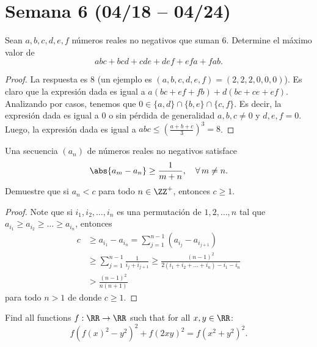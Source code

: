 \section{Semana 6 (04/18 -- 04/24)}


\begin{probEG}
	Sean $a,b,c,d,e,f$ números reales no negativos que suman $6$. Determine el máximo valor de
	\[abc+bcd+cde+def+efa+fab.\]
\end{probEG}

\begin{proof}
	La respuesta es $8$ (un ejemplo es $(a,b,c,d,e,f)=(2,2,2,0,0,0)$). Es claro que la expresión dada es igual a $a(bc+ef+fb)+d(bc+ce+ef)$. Analizando por casos, tenemos que $0\in\{a,d\}\cap\{b,e\}\cap\{c,f\}$. Es decir, la expresión dada es igual a $0$ o sin pérdida de generalidad $a,b,c\ne 0$ y $d,e,f=0$. Luego, la expresión dada es igual a $abc\le\left(\frac{a+b+c}{3}\right)^3=8$.
\end{proof}

\begin{probMR}
	Una secuencia $(a_n)$ de números reales no negativos satisface
	\[\abs{a_m-a_n}\ge\frac{1}{m+n},\quad\forall\,m\ne n.\]
	Demuestre que si $a_n<c$ para todo $n\in\ZZ^+$, entonces $c\ge 1$.
\end{probMR}

\begin{proof}
	Note que si $i_1,i_2,\dots,i_n$ es una permutación de $1,2,\dots,n$ tal que $a_{i_1}\ge a_{i_2}\ge\dots\ge a_{i_n}$, entonces
	\begin{align*}
		c&\ge a_{i_1}-a_{i_n}
		=\sum_{j=1}^{n-1}(a_{i_j}-a_{i_{j+1}})\\
		&\ge\sum_{j=1}^{n-1}\frac{1}{i_j+i_{j+1}}
		\ge\frac{(n-1)^2}{2(i_1+i_2+\dots+i_n)-i_1-i_n}\\
		&>\frac{(n-1)^2}{n(n+1)}
	\end{align*}
	para todo $n>1$ de donde $c\ge 1$.
\end{proof}


\begin{problem}
	Find all functions $f:\RR\to\RR$ such that for all $x,y\in\RR$:
	\[f\left(f(x)^2-y^2\right)^2+f(2xy)^2=f\left(x^2+y^2\right)^2.\]
\end{problem}

